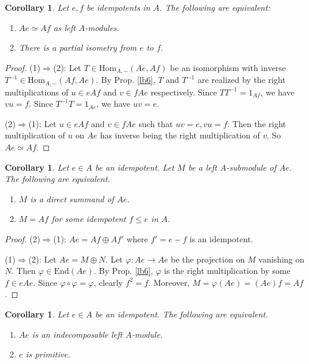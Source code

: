 \documentclass[11pt,b5paper,notitlepage]{article}
\theoremstyle{definition}
\theoremstyle{plain}
\newtheorem{co}[df]{Corollary}
\newcommand{\End}{\mathrm{End}} %
\newcommand{\Hom}{\mathrm{Hom}}
\numberwithin{equation}{section}
\begin{document}
\begin{co}\label{lb13}
Let $e,f$ be idempotents in $A$. The following are equivalent: 
\begin{enumerate}[label=(\arabic*)]
\item $Ae\simeq Af$ as left $A$-modules.
\item There is a partial isometry from $e$ to $f$.
\end{enumerate}
\end{co}


\begin{proof}
(1)$\Rightarrow$(2): Let $T\in\Hom_{A,-}(Ae,Af)$ be an isomorphism with inverse $T^{-1}\in\Hom_{A,-}(Af,Ae)$. By Prop. \ref{lb6}, $T$ and $T^{-1}$ are realized by the right multiplications of $u\in eAf$ and $v\in fAe$ respectively. Since $TT^{-1}=1_{Af}$, we have $vu=f$. Since $T^{-1}T=1_{Ae}$, we have $uv=e$.

(2)$\Rightarrow$(1): Let $u\in eAf$ and $v\in fAe$ such that $uv=e,vu=f$. Then the right multiplication of $u$ on $Ae$ has inverse being the right multiplication of $v$. So $Ae\simeq Af$.
\end{proof}

\begin{co}\label{lb3}
Let $e\in A$ be an idempotent. Let $M$ be a left $A$-submodule of $Ae$. The following are equivalent.
\begin{enumerate}
\item[(1)] $M$ is a direct summand of $Ae$.
\item[(2)]  $M=Af$ for some idempotent $f\leq e$ in $A$.
\end{enumerate}
\end{co}

\begin{proof}
(2)$\Rightarrow$(1): $Ae=Af\oplus Af'$ where $f'=e-f$ is an idempotent.

(1)$\Rightarrow$(2): Let $Ae=M\oplus N$. Let $\varphi:Ae\rightarrow Ae$ be the projection on $M$ vanishing on $N$. Then $\varphi\in\End(Ae)$. By Prop. \ref{lb6}, $\varphi$ is the right multiplication by some $f\in eAe$. Since $\varphi\circ\varphi=\varphi$, clearly $f^2=f$. Moreover, $M=\varphi(Ae)=(Ae)f=Af$. 
\end{proof}



\begin{co}\label{lb5}
Let $e\in A$ be an idempotent. The following are equivalent.
\begin{enumerate}
\item[(1)] $Ae$ is an indecomposable left $A$-module.
\item[(2)] $e$ is primitive. 
\end{enumerate}
\end{co}
\end{document}
